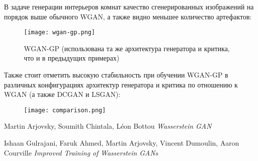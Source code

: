 \documentclass{article}
\begin{document}
В задаче генерации интерьеров комнат качество сгенерированных изображений на порядок выше обычного WGAN, а также видно меньшее количество артефактов:

 
\begin{figure}[h]
\centering
\texttt{[image: wgan-gp.png]}
\caption{WGAN-GP (использована та же архитектура генератора и критика, что и в предыдущих примерах)}
\end{figure}

\newpage

Также стоит отметить высокую стабильность при обучении WGAN-GP в различных конфигурациях архитектур генератора и критика по отношению к WGAN (а также DCGAN и LSGAN):

\begin{figure}[h]
\centering
\texttt{[image: comparison.png]}
\end{figure}



\begin{thebibliography}{1}


Martin Arjovsky, Soumith Chintala, Léon Bottou {\em  Wasserstein GAN}

 Ishaan Gulrajani, Faruk Ahmed, Martin Arjovsky, Vincent Dumoulin, Aaron Courville
{\em Improved Training of Wasserstein GANs}

\end{thebibliography}
\end{document}
